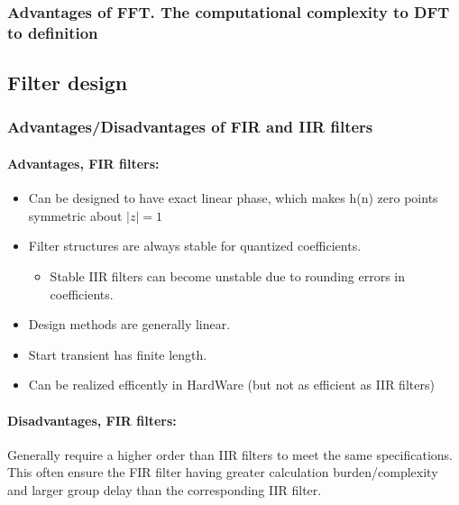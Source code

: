 \documentclass{article}
\begin{document}
\subsubsection{Advantages of FFT. The computational complexity to DFT to definition}

\subsection{Filter design}

\subsubsection{Advantages/Disadvantages of FIR and IIR filters}
\paragraph{Advantages, FIR filters:}
\begin{itemize}
    \item Can be designed to have exact linear phase, which makes h(n) zero points symmetric about $|z| = 1$
    \item  Filter structures are always stable for quantized coefficients.
    \begin{itemize}
        \item Stable IIR filters can become unstable due to rounding errors in coefficients.
    \end{itemize}
    \item Design methods are generally linear. 
    \item Start transient has finite length.
    \item Can be realized efficently in HardWare (but not as efficient as IIR filters)
\end{itemize}

\paragraph{Disadvantages, FIR filters:}

Generally require a higher order than IIR filters to meet the same specifications. This often ensure the FIR filter having greater calculation burden/complexity and larger group delay than the corresponding IIR filter.
\end{document}

